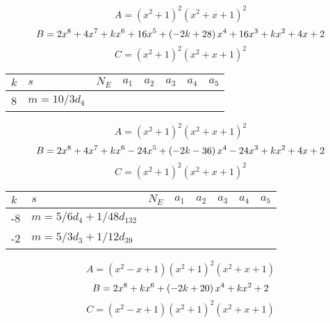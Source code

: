 \documentclass{amsart}
\begin{document}
$$A=(x^2
 + 1)^{2}(x^2
 + x
 + 1)^{2}$$
$$B=2\*x^8
 + 4\*x^7
 + k\*x^6
 + 16\*x^5
 + \left(-2\*k
 + 28\right) \*x^4
 + 16\*x^3
 + k\*x^2
 + 4\*x
 + 2$$
$$C=(x^2
 + 1)^{2}(x^2
 + x
 + 1)^{2}$$
\begin{longtable}{|l|l|l|lllll|}
\hline
$k$ & $s$ & $N_E$ & $a_1$ & $a_2$ & $a_3$ & $a_4$ & $a_5$\\
\hline
8&$m=10/3d_{4}$&&\multicolumn{5}{c|}{}\\
\hline
\end{longtable}
$$A=(x^2
 + 1)^{2}(x^2
 + x
 + 1)^{2}$$
$$B=2\*x^8
 + 4\*x^7
 + k\*x^6
 - 24\*x^5
 + \left(-2\*k
 - 36\right) \*x^4
 - 24\*x^3
 + k\*x^2
 + 4\*x
 + 2$$
$$C=(x^2
 + 1)^{2}(x^2
 + x
 + 1)^{2}$$
\begin{longtable}{|l|l|l|lllll|}
\hline
$k$ & $s$ & $N_E$ & $a_1$ & $a_2$ & $a_3$ & $a_4$ & $a_5$\\
\hline
-8&$m=5/6d_{4}+1/48d_{132}$&&\multicolumn{5}{c|}{}\\
-2&$m=5/3d_{3}+1/12d_{39}$&&\multicolumn{5}{c|}{}\\
\hline
\end{longtable}
$$A=(x^2
 - x
 + 1)(x^2
 + 1)^{2}(x^2
 + x
 + 1)$$
$$B=2\*x^8
 + k\*x^6
 + \left(-2\*k
 + 20\right) \*x^4
 + k\*x^2
 + 2$$
$$C=(x^2
 - x
 + 1)(x^2
 + 1)^{2}(x^2
 + x
 + 1)$$
\end{document}

